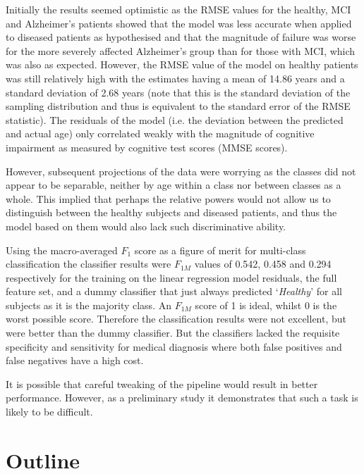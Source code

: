 Initially the results seemed optimistic as the RMSE values for the healthy, MCI and Alzheimer's patients showed that the model was less accurate when applied to diseased patients as hypothesised and that the magnitude of failure was worse for the more severely affected Alzheimer's group than for those with MCI, which was also as expected. However, the RMSE value of the model on healthy patients was still relatively high with the estimates having a mean of 14.86 years and a standard deviation of 2.68 years (note that this is the standard deviation of the sampling distribution and thus is equivalent to the standard error of the RMSE statistic). The residuals of the model (i.e. the deviation between the predicted and actual age) only correlated weakly with the magnitude of cognitive impairment as measured by cognitive test scores (MMSE scores).

However, subsequent projections of the data were worrying as the classes did not appear to be separable, neither by age within a class nor between classes as a whole. This implied that perhaps the relative powers would not allow us to distinguish between the healthy subjects and diseased patients, and thus the model based on them would also lack such discriminative ability. 

Using the macro-averaged $F_1$ score as a figure of merit for multi-class classification\cite{Sokolova2009} the classifier results were $F_{1M}$ values of 0.542, 0.458 and 0.294 respectively for the training on the linear regression model residuals, the full feature set, and a dummy classifier that just always predicted `\textit{Healthy}' for all subjects as it is the majority class. An $F_{1M}$ score of 1 is ideal, whilst 0 is the worst possible score. Therefore the classification results were not excellent, but were better than the dummy classifier. But the classifiers lacked the requisite specificity and sensitivity for medical diagnosis where both false positives and false negatives have a high cost.

It is possible that careful tweaking of the pipeline would result in better performance. However, as a preliminary study it demonstrates that such a task is likely to be difficult.



\newpage

\section{Outline}

